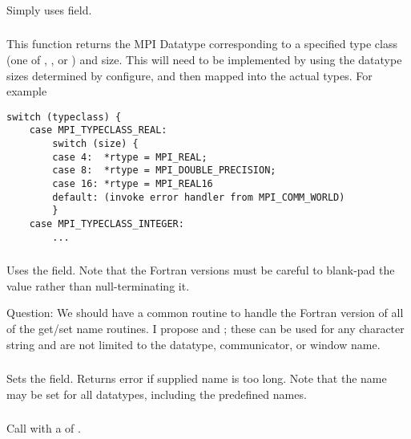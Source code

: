 \documentclass{article}
\begin{document}
\subsubsection{}
Simply uses  field.

\subsubsection{}
This function returns the MPI Datatype corresponding to a specified type class
(one of , , or
) and size.  This will need to be implemented
by using the datatype sizes determined by configure, and then mapped into 
the actual types.  For example
\begin{verbatim}
switch (typeclass) {
    case MPI_TYPECLASS_REAL:
        switch (size) {
        case 4:  *rtype = MPI_REAL;
        case 8:  *rtype = MPI_DOUBLE_PRECISION;
        case 16: *rtype = MPI_REAL16
        default: (invoke error handler from MPI_COMM_WORLD)
        }
    case MPI_TYPECLASS_INTEGER:
        ...
\end{verbatim}


\subsubsection{}
Uses the  field.  Note that the Fortran
versions must be careful to 
blank-pad the value rather than null-terminating it.

Question: We should have a common routine to handle the Fortran version of all
of the get/set name routines.  I propose  and
; these can be used for any character string and
are not limited to the datatype, communicator, or window name.

\subsubsection{}
Sets the  field.  Returns error if supplied
name is too long. 
Note that the name may be set for all datatypes, including the predefined
names.

\subsubsection{}
Call  with a  of .
\end{document}
